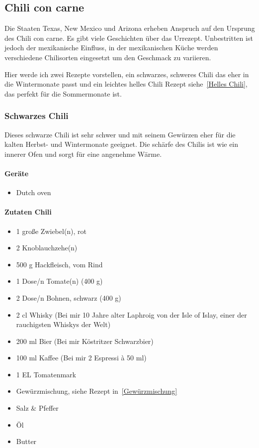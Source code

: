 \subsection{Chili con carne}
Die Staaten Texas, New Mexico und Arizona erheben Anspruch auf den Ursprung des Chili con carne. Es gibt viele Geschichten über das Urrezept. Unbestritten ist jedoch 
der mexikanische Einfluss, in der mexikanischen Küche werden verschiedene 
Chilisorten eingesetzt um den Geschmack zu variieren.

Hier werde ich zwei Rezepte vorstellen, ein schwarzes, schweres Chili das 
eher in die Wintermonate passt und ein leichtes helles Chili Rezept 
siehe~\vref{Helles Chili}, das perfekt für die Sommermonate ist.

\subsubsection{Schwarzes Chili}
Dieses schwarze Chili ist sehr schwer und mit seinem Gewürzen eher für die 
kalten Herbst- und Wintermonate geeignet. Die schärfe des Chilis ist wie ein 
innerer Ofen und sorgt für eine angenehme Wärme.

\paragraph{Geräte}

\begin{itemize}[noitemsep]
	\item Dutch oven
\end{itemize}

\paragraph{Zutaten Chili}

\begin{itemize}[noitemsep]
	\item 1 große Zwiebel(n), rot
	\item 2 Knoblauchzehe(n)
	\item 500 g Hackfleisch, vom Rind
	\item 1 Dose/n Tomate(n) (400 g)
	\item 2 Dose/n Bohnen, schwarz (400 g)
	\item 2 cl Whisky (Bei mir 10 Jahre alter Laphroig von der Isle of Islay, einer 
	der rauchigsten Whiskys der Welt)
	\item 200 ml Bier (Bei mir Köstritzer Schwarzbier)
	\item 100 ml Kaffee (Bei mir 2 Espressi à 50 ml)
	\item 1 EL	Tomatenmark
	\item Gewürzmischung, siehe Rezept in~\vref{Gewürzmischung}
	\item Salz \& Pfeffer
	\item Öl
	\item Butter
\end{itemize}



